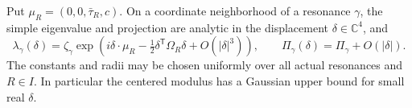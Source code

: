 \begin{proposition}
\label{prop:v40-resonant-curvature}
Put $\mu_R=(0,0,\bar\tau_R,c)$. On a coordinate neighborhood of a
resonance $\gamma$, the simple eigenvalue and projection are analytic
in the displacement $\delta\in\mathbb C^4$, and
\begin{equation}\label{eq:v40-resonant-expansion}
 \lambda_\gamma(\delta)
  =\zeta_\gamma\exp\left(i\delta\cdot\mu_R
          -\tfrac12\delta^{\mathsf T}\Omega_R\delta
          +O(|\delta|^3)\right),\qquad
 \Pi_\gamma(\delta)=\Pi_\gamma+O(|\delta|).
\end{equation}
The constants and radii may be chosen uniformly over all actual
resonances and $R\in I$. In particular the centered modulus has a
Gaussian upper bound for small real $\delta$.
\end{proposition}
